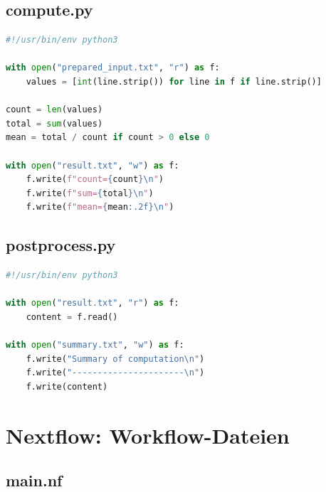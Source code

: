 \section{compute.py}
\label{app:scripts:compute}

\begin{lstlisting}[language=Python,
                   caption={compute.py: Statistiken berechnen},
                   label={lst:app:compute}]
#!/usr/bin/env python3

with open("prepared_input.txt", "r") as f:
    values = [int(line.strip()) for line in f if line.strip()]

count = len(values)
total = sum(values)
mean = total / count if count > 0 else 0

with open("result.txt", "w") as f:
    f.write(f"count={count}\n")
    f.write(f"sum={total}\n")
    f.write(f"mean={mean:.2f}\n")
\end{lstlisting}

\section{postprocess.py}
\label{app:scripts:postprocess}

\begin{lstlisting}[language=Python,
                   caption={postprocess.py: Zusammenfassung erstellen},
                   label={lst:app:postprocess}]
#!/usr/bin/env python3

with open("result.txt", "r") as f:
    content = f.read()

with open("summary.txt", "w") as f:
    f.write("Summary of computation\n")
    f.write("----------------------\n")
    f.write(content)
\end{lstlisting}

\chapter{Nextflow: Workflow-Dateien}
\label{app:nextflow}

\section{main.nf}
\label{app:nextflow:mainnf}


